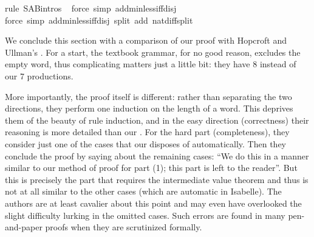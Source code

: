\begin{isabellebody}
\isamarkupfalse%
rule\ S{\isacharunderscore}A{\isacharunderscore}B{\isachardot}intros{\isacharparenright}\isanewline
\ \isamarkupfalse%
force\ simp\ add{\isacharcolon}min{\isacharunderscore}less{\isacharunderscore}iff{\isacharunderscore}disj{\isacharparenright}\isanewline
\isamarkupfalse%
force\ simp\ add{\isacharcolon}min{\isacharunderscore}less{\isacharunderscore}iff{\isacharunderscore}disj\ split\ add{\isacharcolon}\ nat{\isacharunderscore}diff{\isacharunderscore}split{\isacharparenright}\isamarkupfalse%
%
\begin{isamarkuptext}%
We conclude this section with a comparison of our proof with 
Hopcroft and Ullman's
\cite[p.]{HopcroftUllman}.
For a start, the textbook
grammar, for no good reason, excludes the empty word, thus complicating
matters just a little bit: they have 8 instead of our 7 productions.

More importantly, the proof itself is different: rather than
separating the two directions, they perform one induction on the
length of a word. This deprives them of the beauty of rule induction,
and in the easy direction (correctness) their reasoning is more
detailed than our . For the hard part (completeness), they
consider just one of the cases that our  disposes of
automatically. Then they conclude the proof by saying about the
remaining cases: ``We do this in a manner similar to our method of
proof for part (1); this part is left to the reader''. But this is
precisely the part that requires the intermediate value theorem and
thus is not at all similar to the other cases (which are automatic in
Isabelle). The authors are at least cavalier about this point and may
even have overlooked the slight difficulty lurking in the omitted
cases.  Such errors are found in many pen-and-paper proofs when they
are scrutinized formally.%
%
\end{isamarkuptext}%
\isamarkuptrue%
\isamarkupfalse%
\end{isabellebody}%
